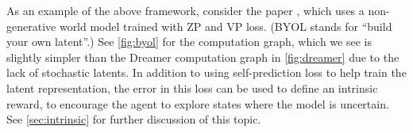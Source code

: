 As an example of the above framework,
consider the  paper
\citep{BYOLexplore}, which uses a  non-generative world model
trained with ZP and VP loss.
(BYOL stands for ``build your own latent''.)
See  \cref{fig:byol} for 
the computation graph,
which we see is slightly simpler than the
Dreamer computation graph in \cref{fig:dreamer}
due to the lack of stochastic latents.
In addition to using self-prediction loss to help train the latent
representation, the error in this loss can be used
to define an intrinsic reward, to encourage the agent
to explore states where the model is uncertain.
See \cref{sec:intrinsic} for further discussion of this topic.






